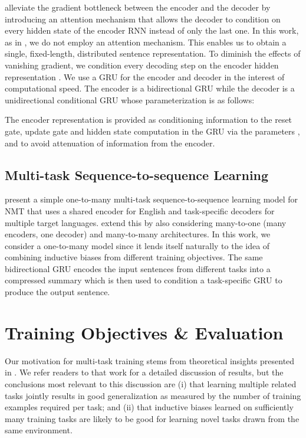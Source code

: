 \documentclass{article} \usepackage{iclr2018_conference,times}
\begin{document}
\cite{bahdanau2014neural} alleviate the gradient bottleneck between the encoder and the decoder by introducing an attention mechanism that allows the decoder to condition on every hidden state of the encoder RNN instead of only the last one. In this work, as in \cite{kiros2015skip,hill2016learning}, we do not employ an attention mechanism. This enables us to obtain a single, fixed-length, distributed sentence representation. To diminish the effects of vanishing gradient, we condition every decoding step on the encoder hidden representation . We use a GRU for the encoder and decoder in the interest of computational speed. The encoder is a bidirectional GRU while the decoder is a unidirectional conditional GRU whose parameterization is as follows:


The encoder representation  is provided as conditioning information to the reset gate, update gate and hidden state computation in the GRU via the parameters ,  and  to avoid attenuation of information from the encoder.

\subsection{Multi-task Sequence-to-sequence Learning}
\cite{dong2015multi} present a simple one-to-many multi-task sequence-to-sequence learning model for NMT that uses a shared encoder for English and task-specific decoders for multiple target languages. \cite{luong2015multi} extend this by also considering many-to-one (many encoders, one decoder) and many-to-many architectures.
In this work, we consider a one-to-many model since it lends itself naturally to the idea of combining inductive biases from different training objectives. The same bidirectional GRU encodes the input sentences from different tasks into a compressed summary  which is then used to condition a task-specific GRU to produce the output sentence.

\section{Training Objectives \& Evaluation}
Our motivation for multi-task training stems from theoretical insights presented in \cite{baxter2000model}. We refer readers to that work for a detailed discussion of results, but the conclusions most relevant to this discussion are (i) that learning multiple related tasks jointly results in good generalization as measured by the number of training examples required per task; and (ii) that inductive biases learned on sufficiently many training tasks are likely to be good for learning novel tasks drawn from the same environment.
\end{document}
